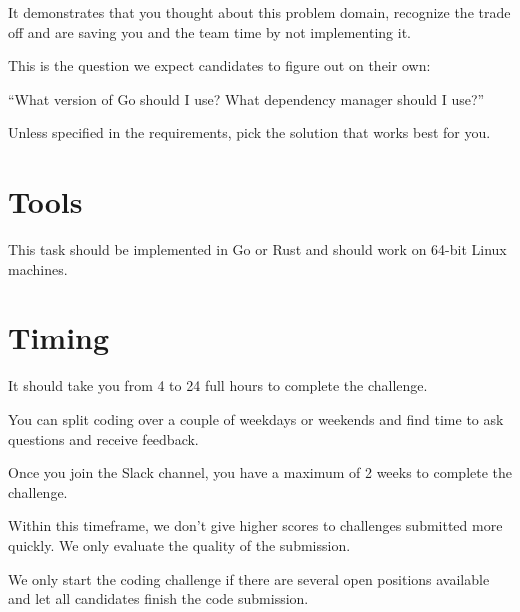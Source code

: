 \documentclass{article}
\begin{document}
It demonstrates that you thought about this problem domain, recognize the trade off and are saving you and the team time by not implementing it.

This is the question we expect candidates to figure out on their own:

``What version of Go should I use? What dependency manager should I use?''

Unless specified in the requirements, pick the solution that works best for you.

\section{Tools}

This task should be implemented in Go or Rust and should work on 64-bit Linux machines.

\section{Timing}

It should take you from 4 to 24 full hours to complete the challenge.

You can split coding over a couple of weekdays or weekends and find time to ask questions and receive feedback.

Once you join the Slack channel, you have a maximum of 2 weeks to complete the challenge.

Within this timeframe, we don't give higher scores to challenges submitted more quickly.
We only evaluate the quality of the submission.

We only start the coding challenge if there are several open positions available and let
all candidates finish the code submission.
\end{document}
